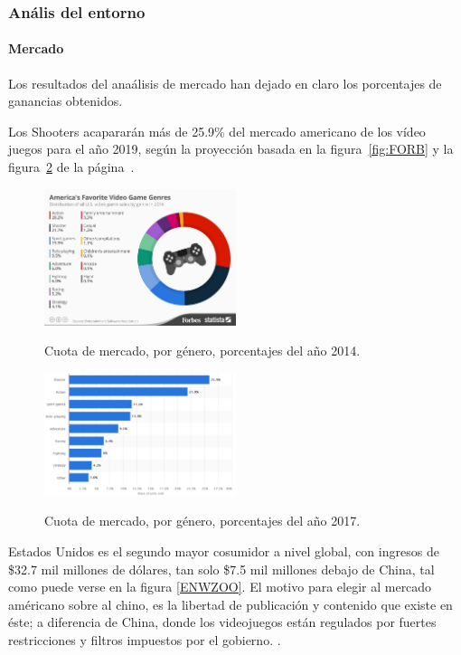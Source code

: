 \documentclass[]{article}
\begin{document}
\subsubsection{An\'alis del entorno}
\paragraph{Mercado}
Los resultados del ana\'alisis de mercado han dejado en claro los porcentajes de ganancias obtenidos. 

Los Shooters acaparar\'an m\'as de 25.9\% del  mercado americano de los v\'ideo juegos para el a\~no 2019, seg\'un la proyecci\'on basada en la figura~\ref{fig:FORB}  y la figura~\ref{STAT} de la p\'agina~\pageref{STAT}.


\begin{figure}[H]
	
	\centering
	\includegraphics[width=0.5\textwidth]{Picture1}
	\caption{Cuota de mercado, por g\'enero, porcentajes del a\~no 2014.} 
	\label{FORB}
	\cite{Forbes}
	
	
\end{figure}

\begin{figure}[H]
	
	\centering
	\includegraphics[width=0.5\textwidth]{statista-2}
	\caption{Cuota de mercado, por g\'enero, porcentajes del a\~no 2017.  } 
	\label{STAT}
	\cite{Statista}
	
	
\end{figure}

Estados Unidos es el segundo mayor cosumidor a nivel global, con ingresos de \$32.7 mil millones de d\'olares, tan solo \$7.5 mil millones debajo de China, tal como puede verse en la figura \ref{ENWZOO}.
El motivo para elegir al mercado am\'ericano sobre al chino, es la libertad de publicaci\'on y contenido que existe en \'este; a diferencia de China, donde los videojuegos est\'an regulados por fuertes restricciones y filtros impuestos por el gobierno. \cite{china1}.
\end{document}

